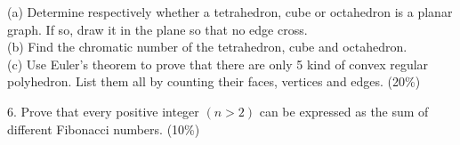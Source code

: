 \documentclass{article}
\begin{document}
(a) Determine respectively whether a tetrahedron, cube or octahedron is a planar graph. If so, draw it in the plane so that no edge cross.\\
(b) Find the chromatic number of the tetrahedron, cube and octahedron.\\
(c) Use Euler's theorem to prove that there are only 5 kind of convex regular polyhedron. List them all by counting their faces, vertices and edges. (20\%)

6. Prove that every positive integer $(n>2)$ can be expressed as the sum of different Fibonacci numbers. (10\%)
\end{document}
